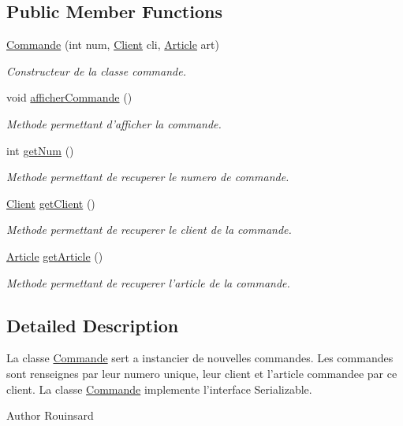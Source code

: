 \subsection*{Public Member Functions}
\begin{DoxyCompactItemize}
\item 
\hyperlink{classgestion_commande_1_1_commande_a05c95335b8ffd8af844cfd45706a525f}{Commande} (int num, \hyperlink{classgestion_commande_1_1_client}{Client} cli, \hyperlink{classgestion_commande_1_1_article}{Article} art)
\begin{DoxyCompactList}\small\item\em Constructeur de la classe commande. \end{DoxyCompactList}\item 
void \hyperlink{classgestion_commande_1_1_commande_a28e22a23c75689f346b8d130e3f326eb}{afficher\-Commande} ()
\begin{DoxyCompactList}\small\item\em Methode permettant d'afficher la commande. \end{DoxyCompactList}\item 
int \hyperlink{classgestion_commande_1_1_commande_ad7592dce621f208b4929c6f7baf28aa6}{get\-Num} ()
\begin{DoxyCompactList}\small\item\em Methode permettant de recuperer le numero de commande. \end{DoxyCompactList}\item 
\hyperlink{classgestion_commande_1_1_client}{Client} \hyperlink{classgestion_commande_1_1_commande_aeaa08b1cafcdb48bcc6f70066a949f23}{get\-Client} ()
\begin{DoxyCompactList}\small\item\em Methode permettant de recuperer le client de la commande. \end{DoxyCompactList}\item 
\hyperlink{classgestion_commande_1_1_article}{Article} \hyperlink{classgestion_commande_1_1_commande_a5bc20e7184b4d85e5fbbcbbe05c5aa4e}{get\-Article} ()
\begin{DoxyCompactList}\small\item\em Methode permettant de recuperer l'article de la commande. \end{DoxyCompactList}\end{DoxyCompactItemize}


\subsection{Detailed Description}
La classe \hyperlink{classgestion_commande_1_1_commande}{Commande} sert a instancier de nouvelles commandes. Les commandes sont renseignes par leur numero unique, leur client et l'article commandee par ce client. La classe \hyperlink{classgestion_commande_1_1_commande}{Commande} implemente l'interface Serializable. \begin{DoxyAuthor}{Author}
Rouinsard 
\end{DoxyAuthor}


